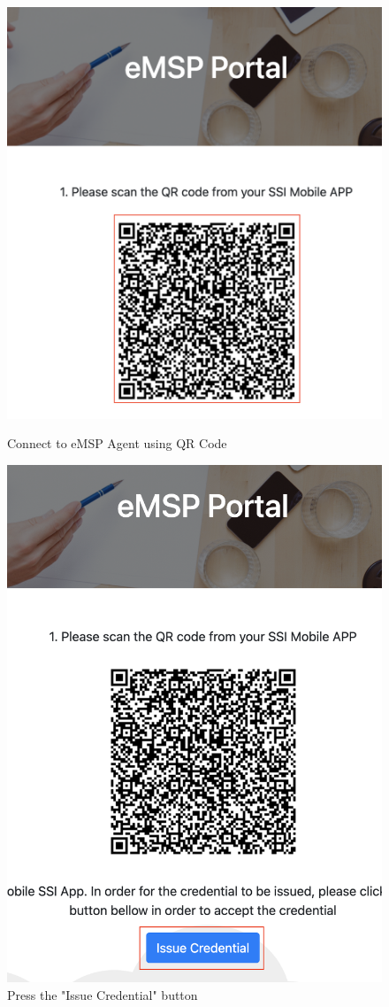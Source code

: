 \begin{figure}[H]
\centering
\begin{minipage}{.5\textwidth}
  \centering
  \includegraphics[width=.8\linewidth]{images/Frontend/eMSP/Screenshot2.png}
  \caption[]{Connect to eMSP Agent using QR Code}
  \label{fig:service_provider_screenshot_2}
\end{minipage}%
\begin{minipage}{.5\textwidth}
  \centering
  \includegraphics[width=.8\linewidth]{images/Frontend/eMSP/Screenshot3.png}
  \caption[]{Press the "Issue Credential" button}
  \label{fig:service_provider_screenshot_3}
\end{minipage}
\end{figure}

